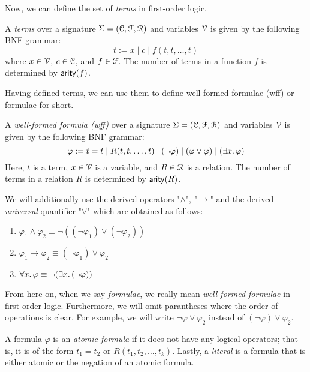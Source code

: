 \documentclass[11pt,usenames, dvipsnames]{article}
\begin{document}
Now, we can define the set of \emph{terms} in first-order logic.

\begin{definition}[Terms]
  A \emph{terms} over a signature $\Sigma = (\conn, \func, \reln)$ and variables $\vars$ is given by the following BNF grammar:
  $$
  t := x \mid c \mid f(t, t, \ldots, t)
  $$
  where $x \in \vars$, $c \in \conn$, and $f \in \func$. The number of terms in a function $f$ is determined by $\mathsf{arity}(f)$.
\end{definition}

Having defined terms, we can use them to define well-formed formulae (wff) or formulae for short.

\begin{definition}[Formulae]
  A \emph{well-formed formula (wff)} over a signature $\Sigma = (\conn, \func, \reln)$ and variables $\vars$ is given by the following BNF grammar:
  $$
  \varphi := t = t \mid R(t, t, \ldots, t) \mid (\neg \varphi) \mid (\varphi \vee \varphi) \mid (\exists x \ldotp \varphi)
  $$
  Here, $t$ is a term, $x \in \vars$ is a variable, and $R \in \reln$ is a relation. The number of terms in a relation $R$ is determined by $\mathsf{arity}(R)$.
\end{definition}

We will additionally use the derived operators "$\wedge$", "$\rightarrow$" and the derived \emph{universal} quantifier "$\forall$" which are obtained as follows:
\begin{enumerate}
  \item $\varphi_1 \wedge \varphi_2 \equiv \neg((\neg \varphi_1) \vee (\neg \varphi_2))$
  \item $\varphi_1 \rightarrow \varphi_2 \equiv (\neg \varphi_1) \vee \varphi_2$
  \item $\forall x \ldotp \varphi \equiv \neg(\exists x \ldotp (\neg \varphi))$
\end{enumerate}

From here on, when we say \emph{formulae}, we really mean \emph{well-formed formulae} in first-order logic. Furthermore, we will omit parantheses where the order of operations is clear. For example, we will write $\neg \varphi \vee \varphi_2$ instead of $(\neg \varphi) \vee \varphi_2$.

A formula $\varphi$ is an \emph{atomic formula} if it does not have any logical operators; that is, it is of the form $t_1 = t_2$ or $R(t_1, t_2, \ldots, t_k)$. Lastly, a \emph{literal} is a formula that is either atomic or the negation of an atomic formula.
\end{document}
